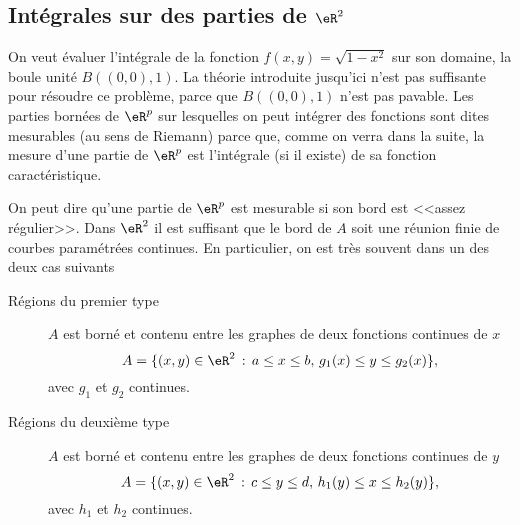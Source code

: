 \subsection{Intégrales sur des parties de \( \eR^2\) }

On veut évaluer l'intégrale de la fonction \( f(x,y)=\sqrt{1-x^2}\) sur son domaine, la boule unité \( B((0,0),1)\). La théorie introduite jusqu'ici n'est pas suffisante pour résoudre  ce problème, parce que \( B((0,0),1)\) n'est pas pavable. Les parties bornées de \( \eR^p\) sur lesquelles on peut intégrer des fonctions sont dites mesurables (au sens de Riemann) parce que, comme on verra dans la suite, la mesure d'une partie de \( \eR^p\) est l'intégrale (si il existe) de sa fonction caractéristique.

On peut dire qu'une partie de \( \eR^p\)  est mesurable si son bord est <<assez régulier>>. Dans \( \eR^2\) il est suffisant que le bord de \( A\) soit une réunion finie de courbes paramétrées continues. En particulier, on est très souvent dans un des deux cas suivants
\begin{description}
	\item[Régions du premier type] \( A\) est borné et contenu entre les graphes de deux fonctions continues de \( x\)
		\[
			A=\{(x,y)\in\eR^2 \,:\, a\leq x\leq b, \, g_1(x)\leq y\leq g_2(x)\},
		\]
		avec \( g_1\) et \( g_2\) continues.
	\item[Régions du deuxième type] \( A\) est borné et contenu entre les graphes de deux fonctions continues de \( y\)
		\[
			A=\{(x,y)\in\eR^2 \,:\, c\leq y\leq d, \, h_1(y)\leq x\leq h_2(y)\},
		\]
		avec \( h_1\) et \( h_2\) continues.
\end{description}
\newcommand{\CaptionFigRegioniPrimoeSecondoTipo}{Régions du premier et du deuxième type}


